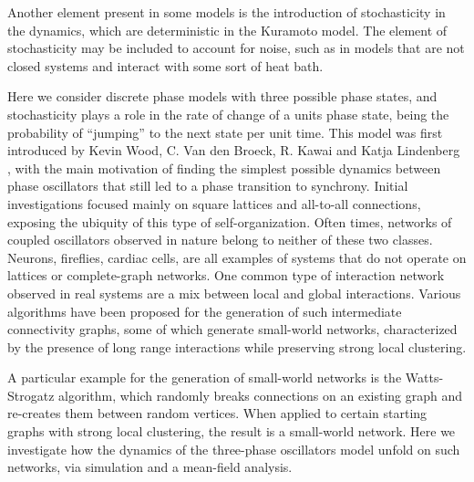 Another element present in some models is the introduction of stochasticity in the dynamics, which are deterministic in the Kuramoto
model. The element of stochasticity may be included to account for noise, such as in models that are not closed systems and interact
with some sort of heat bath.

Here we consider discrete phase models with three possible phase states, and stochasticity plays a role in the rate of change of a
units phase state, being the probability of ``jumping'' to the next state per unit time. This model was first introduced by Kevin Wood,
C. Van den Broeck, R. Kawai and Katja Lindenberg \cite{Wood06a}, with the main motivation of finding the simplest possible dynamics
between phase oscillators that still led to a phase transition to synchrony. Initial investigations focused mainly on square lattices
and all-to-all connections, exposing the ubiquity of this type of self-organization. Often times, networks of coupled oscillators
observed in nature belong to neither of these two classes. Neurons, fireflies, cardiac cells, are all examples of systems that do not
operate on lattices or complete-graph networks. One common type of interaction network observed in real systems are a mix between local
and global interactions. Various algorithms have been proposed for the generation of such intermediate connectivity graphs, some of
which generate small-world networks, characterized by the presence of long range interactions while preserving strong local clustering.

A particular example for the generation of small-world networks is the Watts-Strogatz algorithm, which randomly breaks connections on
an existing graph and re-creates them between random vertices. When applied to certain starting graphs with strong local clustering,
the result is a small-world network. Here we investigate how the dynamics of the three-phase oscillators model unfold on such networks,
via simulation and a mean-field analysis.
